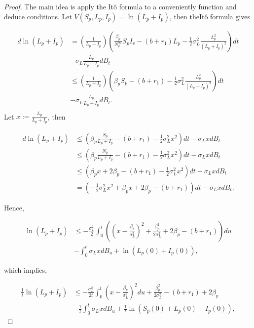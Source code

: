 \begin{proof}
	The main idea is apply the It\^{o} formula to a conveniently function and deduce conditions. Let $V(S_p,L_p,I_p)=\ln(L_p+I_p)$, then theIt\^{o} formula gives
	
		\begin{align*}
			d \ln(L_p+I_p) 
				&=
					\left(\frac{1}{L_p+I_p}\right)\left(\frac{\beta_p}{N_v^\infty} S_p I_v-(b+r_1)L_p-\frac{1}{2}\sigma_L^2\frac{L_p^2}{(L_p+I_p)^2}\right)dt\\
				&-
					\sigma_L \frac{L_p}{L_p+I_p}dB_t\\
				&\leq 
					\left(\frac{1}{L_p+I_p}\right)\left(\beta_p S_p-(b+r_1)-\frac{1}{2}\sigma_L^2\frac{L_p^2}{(L_p+I_p)^2}\right)dt\\
				&-
					\sigma_L \frac{L_p}{L_p+I_p}dB_t.\\
		\end{align*}
	Let $x:=\frac{L_p}{L_p+I_p}$, then
	
	\begin{align*}
		d \ln(L_p+I_p) 
			&\leq 
				\left(\beta_p\frac{S_p}{L_p+I_p}-(b+r_1)-\frac{1}{2}\sigma_L^2x^2\right)dt-\sigma_L xdB_t\\
			&\leq
				\left(\beta_p\frac{N_p}{L_p+I_p}-(b+r_1)-\frac{1}{2}\sigma_L^2x^2\right)dt-\sigma_L xdB_t\\
			&\leq
				\left(\beta_px+2\beta_p-(b+r_1)-\frac{1}{2}\sigma_L^2x^2\right)dt-\sigma_L xdB_t\\
			&=
				\left(-\frac{1}{2}\sigma_L^2x^2+\beta_px+2\beta_p-(b+r_1)\right)dt-\sigma_L xdB_t.			
	\end{align*}
	
	Hence,
	
	\begin{align*}
		\ln(L_p+I_p)
			&\leq
				-\frac{\sigma_L^2}{2}\int_{0}^{t}\left(\left(x-\frac{\beta_p}{\sigma_L^2}\right)^2 +\frac{\beta_p^2}{2\sigma_L^2}+2\beta_p-(b+r_1)\right)du\\
			&-
				\int_{0}^{t}\sigma_L xdB_u+\ln(L_p(0)+I_p(0)),
	\end{align*}
	
	which implies,
	
		\begin{align}\label{eq4.1}
			\frac{1}{t}\ln(L_p+I_p) 
				&\leq
					-\frac{\sigma_L^2}{2t}\int_{0}^{t}\left(x-\frac{\beta_p}{\sigma_L^2}\right)^2du+
					\frac{\beta_p^2}{2\sigma_L^2}-(b+r_1)+2\beta_p\nonumber\\
				&-
					\frac{1}{t}\int_{0}^{t}\sigma_L xdB_u+\frac{1}{t}\ln(S_p(0)+L_p(0)+I_p(0)),
		\end{align}
	

\end{proof}
